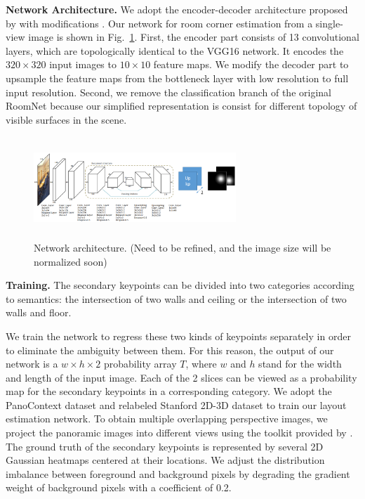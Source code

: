 \noindent\textbf{Network Architecture.} We adopt the encoder-decoder architecture proposed by \cite{roomnet} with modifications . 
Our network for room corner estimation from a single-view image is shown in Fig.~\ref{fig:network}. 
First, the encoder part consists of 13 convolutional layers, which are topologically identical to the VGG16 network. It encodes the $320\times320$ input images to $10\times10$ feature maps. 
We modify the decoder part to upsample the feature maps from the bottleneck layer with low resolution to full input resolution. 
%
Second, we remove the classification branch of the original RoomNet because our simplified representation is consist for different topology of visible surfaces in the scene. 
 

\begin{figure}
	\includegraphics[height=1.5in, width=3in]{figs/network.png}
	\caption{Network architecture. (Need to be refined, and the image size will be normalized soon)}
	\label{fig:network}
\end{figure}

\noindent\textbf{Training.} 
The secondary keypoints can be divided into two categories according to semantics: the intersection of two walls and ceiling or the intersection of two walls and floor.

We train the network to regress these two kinds of keypoints separately in order to eliminate the ambiguity between them. For this reason, the output of our network is a $w \times h \times 2$ probability array $T$, where $w$ and $h$ stand for the width and length of the input image. Each of the 2 slices can be viewed as a probability map for the secondary keypoints in a corresponding category. 
We adopt the PanoContext dataset \cite{pano} and relabeled Stanford 2D-3D dataset \cite{layoutnet} to train our layout estimation network. 
To obtain multiple overlapping perspective images, we project the panoramic images into different views using the toolkit provided by \cite{pano}. The ground truth of the secondary keypoints is represented by several 2D Gaussian heatmaps centered at their locations. We adjust the distribution imbalance between foreground and background pixels by degrading the gradient weight of background pixels with a coefficient of 0.2.

